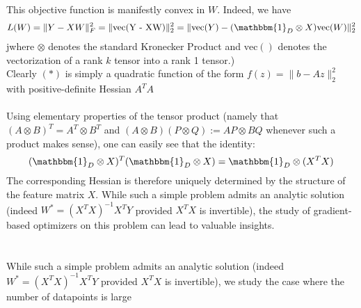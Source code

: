 \documentclass[12pt]{book}
\newcommand{\R}{\mathbb{R}}
\begin{document}
This objective function is manifestly convex in $W$. Indeed, we have 
\begin{align*}
L(W) = \|Y - XW\|_F^2 = \|\text{vec(Y - XW)}\|_2^2 = \|\text{vec}(Y) - (\mathbbm{1}_D \otimes X) \text{vec} (W)\|_2^2  
\end{align*}
jwhere $\otimes$ denotes the standard Kronecker Product and $\text{vec}()$ denotes the vectorization of a rank $k$ tensor into a rank 1 tensor.)\\ 
Clearly $(*)$ is simply a quadratic function of the form $f(z) = \|b - Az\|_2^2$ with positive-definite Hessian $A^{T}A$  \\ \\
Using elementary properties of the tensor product (namely that $(A \otimes B)^T = A^T \otimes  B^T$ and $(A \otimes B)(P \otimes Q) := AP \otimes BQ $ whenever such a product makes sense), one can easily see that the identity:
\[
	(\mathbbm{1} _{D} \otimes X)^T(\mathbbm{1} _D \otimes X) = \mathbbm{1} _D \otimes (X^TX)
\]
The corresponding Hessian is therefore uniquely determined by the structure of the feature matrix $X$. 
While such a simple problem admits an analytic solution (indeed $W^* = (X^{T}X)^{-1}X^{T}Y$ provided $X^{T}X$ is invertible), the study of gradient-based optimizers on this problem can lead to valuable insights.    
\\
\\
\\
While such a simple problem admits an analytic solution (indeed $W^* = (X^{T}X)^{-1}X^{T}Y$ provided $X^{T}X$ is invertible), we study the case where the number of datapoints is large   \\
\end{document}
